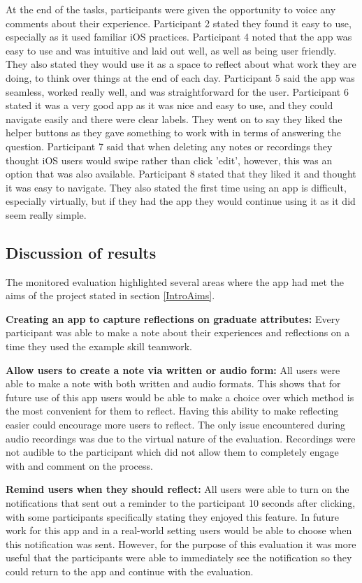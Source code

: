 \documentclass{l4proj}
\begin{document}
At the end of the tasks, participants were given the opportunity to voice any comments about their experience. Participant 2 stated they found it easy to use, especially as it used familiar iOS practices. Participant 4 noted that the app was easy to use and was intuitive and laid out well, as well as being user friendly. They also stated they would use it as a space to reflect about what work they are doing, to think over things at the end of each day. Participant 5 said the app was seamless, worked really well, and was straightforward for the user. Participant 6 stated it was a very good app as it was nice and easy to use, and they could navigate easily and there were clear labels. They went on to say they liked the helper buttons as they gave something to work with in terms of answering the question. Participant 7 said that when deleting any notes or recordings they thought iOS users would swipe rather than click 'edit', however, this was an option that was also available. Participant 8 stated that they liked it and thought it was easy to navigate. They also stated the first time using an app is difficult, especially virtually, but if they had the app they would continue using it as it did seem really simple.

\subsection{Discussion of results}

The monitored evaluation highlighted several areas where the app had met the aims of the project stated in section \ref{IntroAims}.

\textbf{Creating an app to capture reflections on graduate attributes:} Every participant was able to make a note about their experiences and reflections on a time they used the example skill teamwork.

\textbf{Allow users to create a note via written or audio form:} All users were able to make a note with both written and audio formats. This shows that for future use of this app users would be able to make a choice over which method is the most convenient for them to reflect. Having this ability to make reflecting easier could encourage more users to reflect. The only issue encountered during audio recordings was due to the virtual nature of the evaluation. Recordings were not audible to the participant which did not allow them to completely engage with and comment on the process.
 
\textbf{Remind users when they should reflect:} All users were able to turn on the notifications that sent out a reminder to the participant 10 seconds after clicking, with some participants specifically stating they enjoyed this feature. In future work for this app and in a real-world setting users would be able to choose when this notification was sent. However, for the purpose of this evaluation it was more useful that the participants were able to immediately see the notification so they could return to the app and continue with the evaluation.
\end{document}
